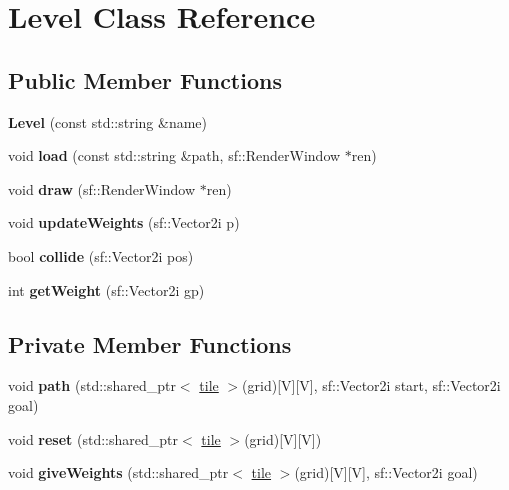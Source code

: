 \hypertarget{class_level}{}\section{Level Class Reference}
\label{class_level}
\subsection*{Public Member Functions}
\begin{DoxyCompactItemize}
\item 
\mbox{\label{class_level_a4c7d4e89ea59866f0fc760b382cedaec}} 
{\bfseries Level} (const std\+::string \&name)
\item 
\mbox{\label{class_level_ac27645024bdde2e14f0d3be90199c540}} 
void {\bfseries load} (const std\+::string \&path, sf\+::\+Render\+Window $\ast$ren)
\item 
\mbox{\label{class_level_aef8f00034e8ad8c09c2a6fb94d2846d3}} 
void {\bfseries draw} (sf\+::\+Render\+Window $\ast$ren)
\item 
\mbox{\label{class_level_a17e945e060e654672dce586d1b8e88f0}} 
void {\bfseries update\+Weights} (sf\+::\+Vector2i p)
\item 
\mbox{\label{class_level_a147e3a6d92281a66ca1ad7b70ffc91be}} 
bool {\bfseries collide} (sf\+::\+Vector2i pos)
\item 
\mbox{\label{class_level_a0d6e676af9f752ef8de6c13a429da176}} 
int {\bfseries get\+Weight} (sf\+::\+Vector2i gp)
\end{DoxyCompactItemize}
\subsection*{Private Member Functions}
\begin{DoxyCompactItemize}
\item 
\mbox{\label{class_level_a995a3e186077e659f3b60619963d8006}} 
void {\bfseries path} (std\+::shared\+\_\+ptr$<$ \mbox{\hyperlink{structtile}{tile}} $>$(grid)\mbox{[}V\mbox{]}\mbox{[}V\mbox{]}, sf\+::\+Vector2i start, sf\+::\+Vector2i goal)
\item 
\mbox{\label{class_level_a660630201931d2c723089eac5ccdba4c}} 
void {\bfseries reset} (std\+::shared\+\_\+ptr$<$ \mbox{\hyperlink{structtile}{tile}} $>$(grid)\mbox{[}V\mbox{]}\mbox{[}V\mbox{]})
\item 
\mbox{\label{class_level_a6b85c06556c61bad34e6795226f79389}} 
void {\bfseries give\+Weights} (std\+::shared\+\_\+ptr$<$ \mbox{\hyperlink{structtile}{tile}} $>$(grid)\mbox{[}V\mbox{]}\mbox{[}V\mbox{]}, sf\+::\+Vector2i goal)
\end{DoxyCompactItemize}
